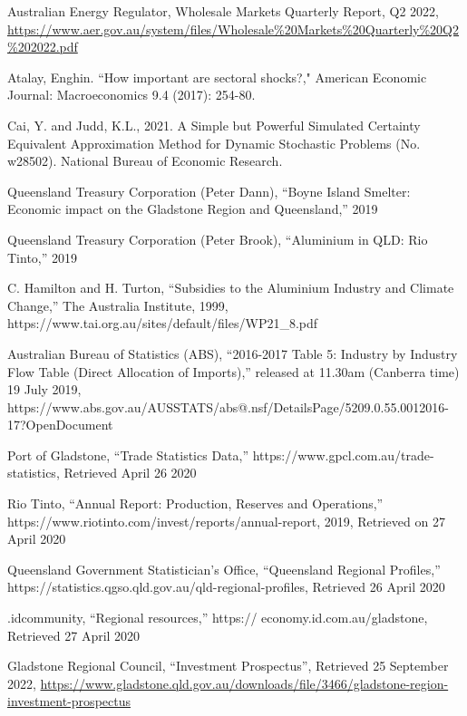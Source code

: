 \documentclass[12pt,a4paper]{article}
\begin{document}
\begin{thebibliography}{1}

   Australian Energy Regulator, Wholesale Markets Quarterly
    Report, Q2 2022, \url{https://www.aer.gov.au/system/files/Wholesale%20Markets%20Quarterly%20Q2%202022.pdf}

   Atalay, Enghin. ``How important are sectoral shocks?,"
    American Economic Journal: Macroeconomics 9.4 (2017): 254-80.

 Cai, Y. and Judd, K.L., 2021. A Simple but Powerful Simulated
  Certainty Equivalent Approximation Method for Dynamic Stochastic Problems
    (No. w28502). National Bureau of Economic Research.

 Queensland Treasury Corporation (Peter Dann), “Boyne Island
  Smelter: Economic impact on the Gladstone Region and Queensland,” 2019

Queensland Treasury Corporation (Peter Brook), ``Aluminium in QLD: Rio Tinto,” 2019
  
C. Hamilton and H. Turton, ``Subsidies to the Aluminium
Industry and Climate Change,'' The Australia Institute, 1999, https://www.tai.org.au/sites/default/files/WP21\_8.pdf

 Australian Bureau of Statistics (ABS), ``2016-2017 Table 5: Industry by
  Industry Flow Table (Direct Allocation of Imports),” released at 11.30am
  (Canberra time) 19 July 2019, https://www.abs.gov.au/AUSSTATS/abs@.nsf/DetailsPage/5209.0.55.0012016-17?OpenDocument

 Port of Gladstone, ``Trade Statistics Data,''
 https://www.gpcl.com.au/trade-statistics, Retrieved  April 26 2020

  Rio Tinto, ``Annual Report: Production, Reserves and Operations,''
https://www.riotinto.com/invest/reports/annual-report, 2019, Retrieved on
27 April 2020

  Queensland Government Statistician’s Office,
  ``Queensland Regional Profiles,”
https://statistics.qgso.qld.gov.au/qld-regional-profiles, Retrieved 26 April 2020 
 
  .idcommunity, “Regional resources,” 
  https:// economy.id.com.au/gladstone, Retrieved 27 April 2020

  Gladstone Regional Council, ``Investment Prospectus'', Retrieved 25 September
    2022,
    \url{https://www.gladstone.qld.gov.au/downloads/file/3466/gladstone-region-investment-prospectus}


\end{thebibliography}
\end{document}
